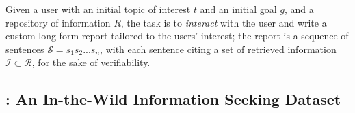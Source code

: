 Given a user with an initial topic of interest $t$ and an initial goal $g$, and a repository of information $R$, the task is to {\em interact} with the user and write a custom long-form report tailored to the users' interest; the report is a sequence of sentences $\mathcal{S}=s_1s_2...s_n$, with each sentence citing a set of retrieved information $\mathcal{I} \subset \mathcal{R}$,  for the sake of verifiability.

\subsection{\data: An In-the-Wild Information Seeking Dataset}
\label{sec:task_data}
\begin{table}
\centering
{}
    \caption{A sample data point in the \data dataset for studying complex information-seeking tasks; the topic and goal are provided by users on the publicly available STORM website, the domain is assigned manually.}
    \label{tab:data_point}
\vspace{-1em}
\end{table}


